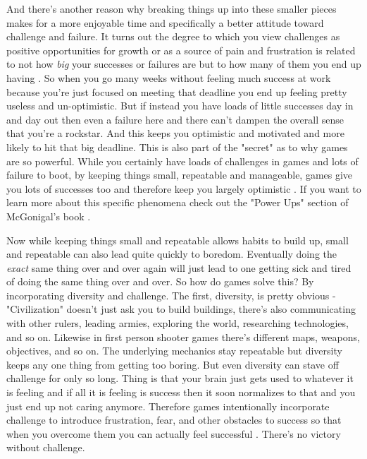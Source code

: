 \documentclass[11pt,a5paper]{book}
\begin{document}
And there's another reason why breaking things up into these smaller pieces makes for a more enjoyable time and specifically a better attitude toward challenge and failure. It turns out the degree to which you view challenges as positive opportunities for growth or as a source of pain and frustration is related to not how \textit{big} your successes or failures are but to how many of them you end up having \cite{superbetter}. So when you go many weeks without feeling much success at work because you're just focused on meeting that deadline you end up feeling pretty useless and un-optimistic. But if instead you have loads of little successes day in and day out then even a failure here and there can't dampen the overall sense that you're a rockstar. And this keeps you optimistic and motivated and more likely to hit that big deadline. This is also part of the "secret" as to why games are so powerful. While you certainly have loads of challenges in games and lots of failure to boot, by keeping things small, repeatable and manageable, games give you lots of successes too and therefore keep you largely optimistic \cite{superbetter}. If you want to learn more about this specific phenomena check out the "Power Ups" section of McGonigal's book \cite{superbetter}. 
\newline

Now while keeping things small and repeatable allows habits to build up, small and repeatable can also lead quite quickly to boredom. Eventually doing the \textit{exact} same thing over and over again will just lead to one getting sick and tired of doing the same thing over and over. So how do games solve this? By incorporating diversity and challenge. The first, diversity, is pretty obvious - "Civilization" doesn't just ask you to build buildings, there's also communicating with other rulers, leading armies, exploring the world, researching technologies, and so on. Likewise in first person shooter games there's different maps, weapons, objectives, and so on. The underlying mechanics stay repeatable but diversity keeps any one thing from getting too boring. But even diversity can stave off challenge for only so long. Thing is that your brain just gets used to whatever it is feeling and if all it is feeling is success then it soon normalizes to that and you just end up not caring anymore. Therefore games intentionally incorporate challenge to introduce frustration, fear, and other obstacles to success so that when you overcome them you can actually feel successful \cite{superbetter}. There's no victory without challenge. 
\newline
\end{document}
